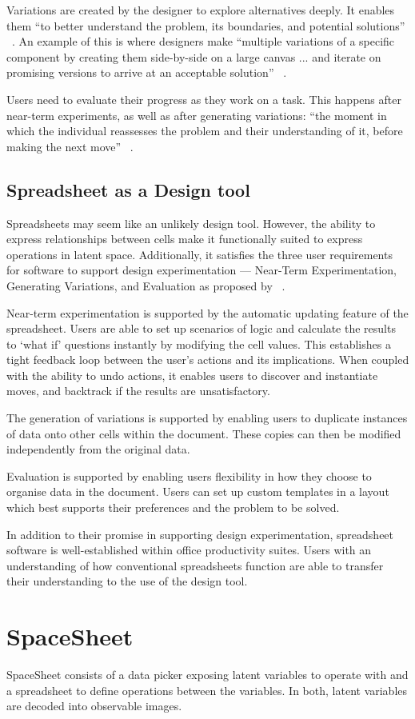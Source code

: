 \documentclass[letterpaper]{article}
\begin{document}
Variations are created by the designer to explore alternatives deeply. It enables them ``to better understand the problem, its boundaries, and potential solutions'' ~\cite[p. 40]{terry02}. An example of this is where designers make ``multiple variations of a specific component by creating them side-by-side on a large canvas ... and iterate on promising versions to arrive at an acceptable solution'' ~\cite[p. 40]{terry02}.

Users need to evaluate their progress as they work on a task. This happens after near-term experiments, as well as after generating variations: ``the moment in which the individual reassesses the problem and their understanding of it, before making the next move'' ~\cite[p. 40]{terry02}.

\subsection{Spreadsheet as a Design tool}

Spreadsheets may seem like an unlikely design tool. However, the ability to express relationships between cells make it functionally suited to express operations in latent space. 
Additionally, it satisfies the three user requirements for software to support design experimentation — Near-Term Experimentation, Generating Variations, and Evaluation as proposed by ~\cite{terry02}.

Near-term experimentation is supported by the automatic updating feature of the spreadsheet. Users are able to set up scenarios of logic and calculate the results to ‘what if’ questions instantly by modifying the cell values. This establishes a tight feedback loop between the user’s actions and its implications. When coupled with the ability to undo actions, it enables users to discover and instantiate moves, and backtrack if the results are unsatisfactory.

The generation of variations is supported by enabling users to duplicate instances of data onto other cells within the document. These copies can then be modified independently from the original data.

Evaluation is supported by enabling users flexibility in how they choose to organise data in the document. Users can set up custom templates in a layout which best supports their preferences and the problem to be solved.

In addition to their promise in supporting design experimentation, spreadsheet software is well-established within office productivity suites. Users with an understanding of how conventional spreadsheets function are able to transfer their understanding to the use of the design tool.

\section{SpaceSheet}

SpaceSheet consists of a data picker exposing latent variables to operate with and a spreadsheet to define operations between the variables. In both, latent variables are decoded into observable images.



\end{document}
